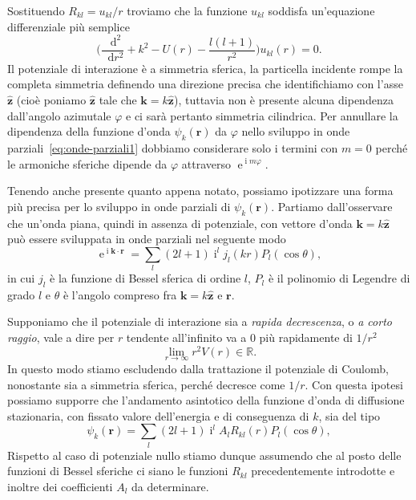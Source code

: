\documentclass[a4paper,fleqn,twoside,12pt]{article}
\renewcommand{\phi}{\varphi}
\newcommand*{\dd}{\mathop{}\!\mathrm{d}} %
\DeclareMathOperator{\e}{\mathrm{e}} %
\DeclareMathOperator{\uimm}{\mathrm{i}} %
\newcommand*{\toder}[3][]{\frac{{\dd^{#1}}#2}{\dd {#3}^{#1}}}
\newcommand*{\versor}[1]{\hat{\bm{#1}}}
\begin{document}
Sostituendo $R_{kl}=u_{kl}/r$ troviamo che la funzione $u_{kl}$ soddisfa
un'equazione differenziale più semplice
\begin{equation}
  \label{eq:diff-u-op}
  \bigg(\toder[2]{}{r} + k^{2} - U(r) - \frac{l(l+1)}{r^{2}}\bigg)u_{kl}(r) = 0.
\end{equation}
Il potenziale di interazione è a simmetria sferica, la particella incidente
rompe la completa simmetria definendo una direzione precisa che identifichiamo
con l'asse $\versor{z}$ (cioè poniamo $\versor{z}$ tale che
$\bm{k} = k\versor{z}$), tuttavia non è presente alcuna dipendenza dall'angolo
azimutale $\phi$ e ci sarà pertanto simmetria cilindrica.  Per annullare la
dipendenza della funzione d'onda $\psi_{k}(\bm{r})$ da $\phi$ nello sviluppo in
onde parziali~\eqref{eq:onde-parziali1} dobbiamo considerare solo i termini con
$m = 0$ perché le armoniche sferiche dipende da $\phi$ attraverso
$\e^{\uimm m \phi}$.

Tenendo anche presente quanto appena notato, possiamo ipotizzare una forma più
precisa per lo sviluppo in onde parziali di $\psi_{k}(\bm{r})$.  Partiamo
dall'osservare che un'onda piana, quindi in assenza di potenziale, con vettore
d'onda $\bm{k} = k\versor{z}$ può essere sviluppata in onde parziali nel
seguente modo
\begin{equation}
  \label{eq:sviluppo-onda-piana}
  \e^{\uimm \bm{k}\cdot\bm{r}} = \sum_{l} (2l+1) \uimm^{l} j_{l}(kr)
  P_{l}(\cos\theta),
\end{equation}
in cui $j_{l}$ è la funzione di Bessel sferica di ordine $l$, $P_{l}$ è il
polinomio di Legendre di grado $l$ e $\theta$ è l'angolo compreso fra
$\bm{k} = k\versor{z}$ e $\bm{r}$.

Supponiamo che il potenziale di interazione sia a \emph{rapida decrescenza}, o
\emph{a corto raggio}, vale a dire per $r$ tendente all'infinito va a $0$ più
rapidamente di $1/r^{2}$
\begin{equation}
  \lim_{r \to \infty} r^{2}V(r) \in \mathbb{R}.
\end{equation}
In questo modo stiamo escludendo dalla trattazione il potenziale di Coulomb,
nonostante sia a simmetria sferica, perché decresce come $1/r$.  Con questa
ipotesi possiamo supporre che l'andamento asintotico della funzione d'onda di
diffusione stazionaria, con fissato valore dell'energia e di conseguenza di $k$,
sia del tipo
\begin{equation}
  \label{eq:onde-parziali2}
  \psi_{k}(\bm{r}) = \sum_{l} (2l+1)\uimm^{l} A_{l} R_{kl}(r) P_{l}(\cos\theta),
\end{equation}
Rispetto al caso di potenziale nullo stiamo dunque assumendo che al posto delle
funzioni di Bessel sferiche ci siano le funzioni $R_{kl}$ precedentemente
introdotte e inoltre dei coefficienti $A_{l}$ da determinare.
\end{document}
